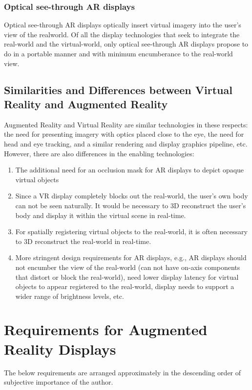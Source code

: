 \subsubsection{Optical see-through AR displays}
\label{sec:background:ost_displays}
Optical see-through AR displays optically insert virtual imagery into the user’s view of the realworld. 
Of all the display technologies that seek to integrate the real-world and the virtual-world, only optical see-through AR displays propose to do in a portable manner and with minimum encumberance to the real-world view.

\subsection{Similarities and Differences between Virtual Reality and Augmented Reality}
\label{sec:background:ar_vs_vr_displays}

Augmented Reality and Virtual Reality are similar technologies in these respects: the need for presenting imagery with optics placed close to the eye, the need for head and eye tracking, and a similar rendering and display graphics pipeline, etc. 
However, there are also differences in the enabling technologies:

\begin{enumerate}
    \item The additional need for an occlusion mask for AR displays to depict opaque virtual objects
    \item Since a VR display completely blocks out the real-world, the user’s own body can not be seen naturally. It would be necessary to 3D reconstruct the user’s body and display it within the virtual scene in real-time.
    \item For spatially registering virtual objects to the real-world, it is often necessary to 3D reconstruct the real-world in real-time.
    \item More stringent design requirements for AR displays, e.g., AR displays should not encumber the view of the real-world (can not have on-axis components that distort or block the real-world), need lower display latency for virtual objects to appear registered to the real-world, display needs to support a wider range of brightness levels, etc. 
\end{enumerate}

\section{Requirements for Augmented Reality Displays}
\label{sec:background:requirements_ar_displays}
The below requirements are arranged approximately in the descending order of subjective importance of the author.

